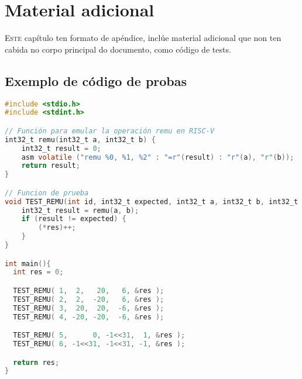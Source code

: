 \appendix
\chapter{Material adicional}
\label{chap:adicional}

\lettrine{E}{ste} capítulo ten formato de apéndice, inclúe material adicional que non ten cabida no corpo principal do documento, como código de tests.

\section{Exemplo de código de probas}
\label{cod_test}

\begin{lstlisting}[language=C]
#include <stdio.h>
#include <stdint.h>

// Función para emular la operación remu en RISC-V
int32_t remu(int32_t a, int32_t b) {
    int32_t result = 0;
    asm volatile ("remu %0, %1, %2" : "=r"(result) : "r"(a), "r"(b));
    return result;
}

// Funcion de prueba
void TEST_REMU(int id, int32_t expected, int32_t a, int32_t b, int32_t *res) {
    int32_t result = remu(a, b); 
    if (result != expected) {
        (*res)++;
    }
}

int main(){
  int res = 0;

  TEST_REMU( 1,  2,   20,   6, &res );
  TEST_REMU( 2,  2,  -20,   6, &res );
  TEST_REMU( 3,  20,  20,  -6, &res );
  TEST_REMU( 4, -20, -20,  -6, &res );

  TEST_REMU( 5,      0, -1<<31,  1, &res );
  TEST_REMU( 6, -1<<31, -1<<31, -1, &res );

  return res;
}
\end{lstlisting}
